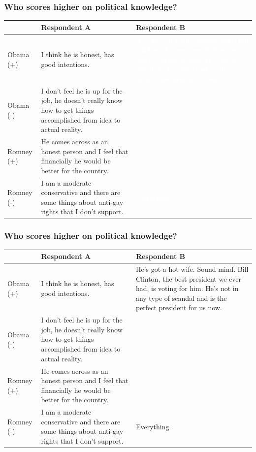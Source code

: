 \documentclass{beamer}
\begin{document}
\begin{frame}%
\frametitle{Who scores higher on political knowledge?}
\begin{table}[ht]\footnotesize\centering
\begin{tabular}{l|p{4.5cm}|p{4.5cm}}
   \toprule
    & \textbf{Respondent A} & \textbf{Respondent B} \\ 
    \midrule
  Obama (+) & I think he is honest, has good intentions. & \textcolor{white}{He's got a hot wife. Sound mind. Bill Clinton, the best president we ever had, is voting for him. He's not in any type of scandal and is the perfect president for us now.} \\ \hdashline
  Obama (-) & I don't feel he is up for the job, he doesn't really know how to get things accomplished from idea to actual reality. &  \\ \hdashline
  Romney (+) & He comes across as an honest person and I feel that financially he would be better for the country. &  \\ \hdashline
  Romney (-) & I am a moderate conservative and there are some things about anti-gay rights that I don't support. & \textcolor{white}{Everything.} \\
    \bottomrule
 \end{tabular}
\end{table}
\end{frame}

\begin{frame}%
\frametitle{Who scores higher on political knowledge?}
\begin{table}[ht]\footnotesize\centering
\begin{tabular}{l|p{4.5cm}|p{4.5cm}}
   \toprule
    & \textbf{Respondent A} & \textbf{Respondent B} \\ 
    \midrule
  Obama (+) & I think he is honest, has good intentions. & He's got a hot wife. Sound mind. Bill Clinton, the best president we ever had, is voting for him. He's not in any type of scandal and is the perfect president for us now. \\ \hdashline
  Obama (-) & I don't feel he is up for the job, he doesn't really know how to get things accomplished from idea to actual reality. &  \\ \hdashline
  Romney (+) & He comes across as an honest person and I feel that financially he would be better for the country. &  \\ \hdashline
  Romney (-) & I am a moderate conservative and there are some things about anti-gay rights that I don't support. & Everything. \\
    \bottomrule
 \end{tabular}
\end{table}
\end{frame}
\end{document}
